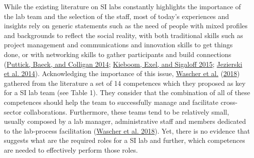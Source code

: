 \documentclass[AMA,STIX1COL,APA,STIX2COL]{WileyNJD-v2}
\begin{document}
While the existing literature on SI labs constantly highlights the
importance of the lab team and the selection of the staff, most of
today's experiences and insights rely on generic statements such as the
need of people with mixed profiles and backgrounds to reflect the social
reality, with both traditional skills such as project management and
communications and innovation skills to get things done, or with
networking skills to gather participants and build connections
(\protect\hyperlink{ref-Puttick2014-Teams}{Puttick, Baeck, and Colligan
2014}; \protect\hyperlink{ref-Kieboom2015}{Kieboom, Exel, and Sigaloff
2015}; \protect\hyperlink{ref-Jezierski2014}{Jezierski et al. 2014}).
Acknowledging the importance of this issue,
\protect\hyperlink{ref-Wascher2018}{Wascher et al.}
(\protect\hyperlink{ref-Wascher2018}{2018}) gathered from the literature
a set of 14 competences which they proposed as key for a SI lab team
(see Table 1). They consider that the combination of all of these
competences should help the team to successfully manage and facilitate
cross-sector collaborations. Furthermore, these teams tend to be
relatively small, usually composed by a lab manager, administrative
staff and members dedicated to the lab-process facilitation
(\protect\hyperlink{ref-Wascher2018}{Wascher et al. 2018}). Yet, there
is no evidence that suggests what are the required roles for a SI lab
and further, which competences are needed to effectively perform those
roles.

\providecommand{\docline}[3]{\noalign{\global\setlength{\arrayrulewidth}{#1}}\arrayrulecolor[HTML]{#2}\cline{#3}}

\setlength{\tabcolsep}{2pt}

\renewcommand*{\arraystretch}{1.5}
\end{document}
